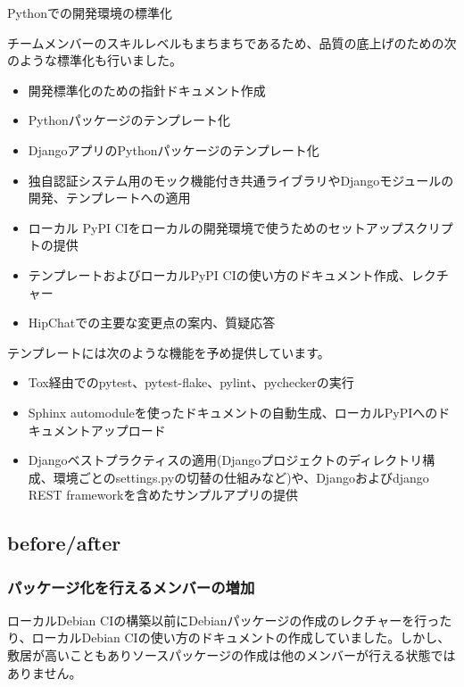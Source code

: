 \documentclass[mingoth,a4paper]{jsarticle}
\begin{document}
{\scriptsize
\begin{itembox}[l]{Pythonでの開発環境の標準化}

チームメンバーのスキルレベルもまちまちであるため、品質の底上げのための次のような標準化も行いました。

\begin{itemize}
\item 開発標準化のための指針ドキュメント作成
\item Pythonパッケージのテンプレート化
\item DjangoアプリのPythonパッケージのテンプレート化
\item 独自認証システム用のモック機能付き共通ライブラリやDjangoモジュールの開発、テンプレートへの適用
\item ローカル PyPI CIをローカルの開発環境で使うためのセットアップスクリプトの提供
\item テンプレートおよびローカルPyPI CIの使い方のドキュメント作成、レクチャー
\item HipChatでの主要な変更点の案内、質疑応答
\end{itemize}

テンプレートには次のような機能を予め提供しています。

\begin{itemize}
\item Tox経由でのpytest、pytest-flake、pylint、pycheckerの実行
\item Sphinx automoduleを使ったドキュメントの自動生成、ローカルPyPIへのドキュメントアップロード
\item Djangoベストプラクティスの適用(Djangoプロジェクトのディレクトリ構成、環境ごとのsettings.pyの切替の仕組みなど)や、Djangoおよびdjango REST frameworkを含めたサンプルアプリの提供
\end{itemize}
\end{itembox}}

\subsection{before/after}

\subsubsection{パッケージ化を行えるメンバーの増加}
ローカルDebian CIの構築以前にDebianパッケージの作成のレクチャーを行ったり、ローカルDebian CIの使い方のドキュメントの作成していました。しかし、敷居が高いこともありソースパッケージの作成は他のメンバーが行える状態ではありません。
\end{document}
